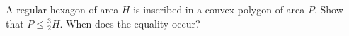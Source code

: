 A regular hexagon of area $H$ is inscribed in a convex polygon of area $P$. Show that $P \leq  \frac{3}{2}H$. When does the equality occur?